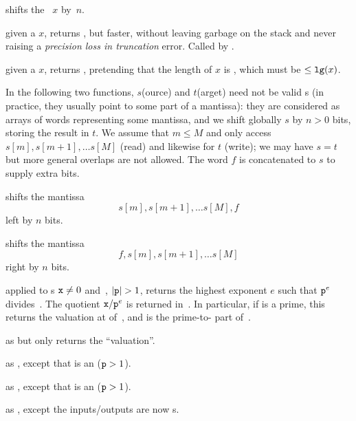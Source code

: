  shifts the ~$x$ by~$n$.

 given a  $x$, returns
, but faster, without leaving garbage on the stack
and never raising a \emph{precision loss in truncation} error.
Called by .

 given a  $x$, returns
, pretending that the length of $x$ is , which must be
$\leq {\tt lg}(x)$.

 In the following two functions, $s$(ource) and $t$(arget)
need not be valid s (in practice, they usually point to some part of a
 mantissa): they are considered as arrays of words representing some
mantissa, and we shift globally $s$ by $n > 0$ bits, storing the result in
$t$. We assume that $m\leq M$ and only access $s[m], s[m+1],\ldots s[M]$
(read) and likewise for $t$ (write); we may have $s = t$ but more general
overlaps are not allowed. The word $f$ is concatenated to $s$ to supply extra
bits.

shifts the mantissa
$$s[m], s[m+1],\ldots s[M], f$$
left by $n$ bits.

shifts the mantissa
$$f, s[m], s[m+1],\ldots s[M]$$
right by $n$ bits.

 applied to s
${\tt x}\neq 0$ and~, $|{\tt p}| > 1$, returns the highest
exponent $e$ such that ${\tt p}^{e}$ divides~. The quotient
${\tt x}/{\tt p}^{e}$ is returned in~. In particular, if  is a
prime, this returns the valuation at  of~, and  is
the prime-to- part of~.

 as  but only returns the
``valuation''.

 as ,
except that  is an  (${\tt p} > 1$).

 as ,
except that  is an  (${\tt p} > 1$).

 as ,
except the inputs/outputs are now s.

